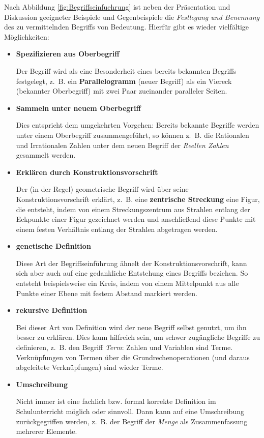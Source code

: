 \documentclass[
  ngerman,
]{scrbook}
\theoremstyle{definition}
\theoremstyle{definition}
\theoremstyle{definition}
\theoremstyle{definition}
\theoremstyle{remark}
\begin{document}
Nach Abbildung \ref{fig:Begriffseinfuehrung} ist neben der Präsentation und Diskussion geeigneter Beispiele und Gegenbeispiele die \emph{Festlegung und Benennung} des zu vermittelnden Begriffs von Bedeutung. Hierfür gibt es wieder vielfältige Möglichkeiten:

\begin{itemize}
\item
  \textbf{Spezifizieren aus Oberbegriff}

  Der Begriff wird als eine Besonderheit eines bereits bekannten Begriffs festgelegt, z.~B. ein \textbf{Parallelogramm} (neuer Begriff) als ein Viereck (bekannter Oberbegriff) mit zwei Paar zueinander paralleler Seiten.
\item
  \textbf{Sammeln unter neuem Oberbegriff}

  Dies entspricht dem umgekehrten Vorgehen: Bereits bekannte Begriffe werden unter einem Oberbegriff zusammengeführt, so können z.~B. die Rationalen und Irrationalen Zahlen unter dem neuen Begriff der \emph{Reellen Zahlen} gesammelt werden.
\item
  \textbf{Erklären durch Konstruktionsvorschrift}

  Der (in der Regel) geometrische Begriff wird über seine Konstruktionsvorschrift erklärt, z.~B. eine \textbf{zentrische Streckung} eine Figur, die entsteht, indem von einem Streckungszentrum aus Strahlen entlang der Eckpunkte einer Figur gezeichnet werden und anschließend diese Punkte mit einem festen Verhältnis entlang der Strahlen abgetragen werden.
\item
  \textbf{genetische Definition}

  Diese Art der Begriffseinführung ähnelt der Konstruktionsvorschrift, kann sich aber auch auf eine gedankliche Entstehung eines Begriffs beziehen. So entsteht beispielsweise ein Kreis, indem von einem Mittelpunkt aus alle Punkte einer Ebene mit festem Abstand markiert werden.
\item
  \textbf{rekursive Definition}

  Bei dieser Art von Definition wird der neue Begriff selbst genutzt, um ihn besser zu erklären. Dies kann hilfreich sein, um schwer zugängliche Begriffe zu definieren, z.~B. den Begriff \emph{Term}: Zahlen und Variablen sind Terme. Verknüpfungen von Termen über die Grundrechenoperationen (und daraus abgeleitete Verknüpfungen) sind wieder Terme.
\item
  \textbf{Umschreibung}

  Nicht immer ist eine fachlich bzw. formal korrekte Definition im Schulunterricht möglich oder sinnvoll. Dann kann auf eine Umschreibung zurückgegriffen werden, z.~B. der Begriff der \emph{Menge} als Zusammenfassung mehrerer Elemente.
\end{itemize}
\end{document}
